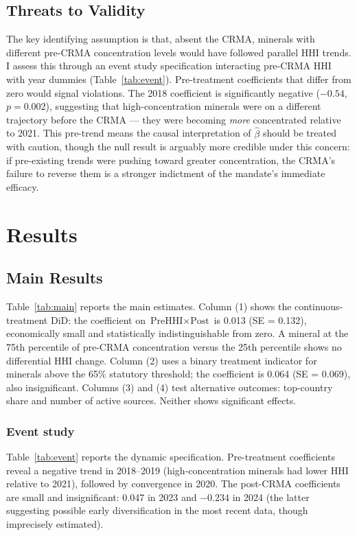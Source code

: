 \documentclass[12pt]{article}
\begin{document}
\subsection{Threats to Validity}

The key identifying assumption is that, absent the CRMA, minerals with different pre-CRMA concentration levels would have followed parallel HHI trends. I assess this through an event study specification interacting pre-CRMA HHI with year dummies (Table~\ref{tab:event}). Pre-treatment coefficients that differ from zero would signal violations. The 2018 coefficient is significantly negative ($-0.54$, $p = 0.002$), suggesting that high-concentration minerals were on a different trajectory before the CRMA --- they were becoming \textit{more} concentrated relative to 2021. This pre-trend means the causal interpretation of $\hat{\beta}$ should be treated with caution, though the null result is arguably more credible under this concern: if pre-existing trends were pushing toward greater concentration, the CRMA's failure to reverse them is a stronger indictment of the mandate's immediate efficacy.


\section{Results}

\subsection{Main Results}

Table~\ref{tab:main} reports the main estimates. Column (1) shows the continuous-treatment DiD: the coefficient on $\text{PreHHI} \times \text{Post}$ is 0.013 (SE = 0.132), economically small and statistically indistinguishable from zero. A mineral at the 75th percentile of pre-CRMA concentration versus the 25th percentile shows no differential HHI change. Column (2) uses a binary treatment indicator for minerals above the 65\% statutory threshold; the coefficient is 0.064 (SE = 0.069), also insignificant. Columns (3) and (4) test alternative outcomes: top-country share and number of active sources. Neither shows significant effects.



\subsubsection*{Event study} Table~\ref{tab:event} reports the dynamic specification. Pre-treatment coefficients reveal a negative trend in 2018--2019 (high-concentration minerals had lower HHI relative to 2021), followed by convergence in 2020. The post-CRMA coefficients are small and insignificant: 0.047 in 2023 and $-0.234$ in 2024 (the latter suggesting possible early diversification in the most recent data, though imprecisely estimated).
\end{document}
